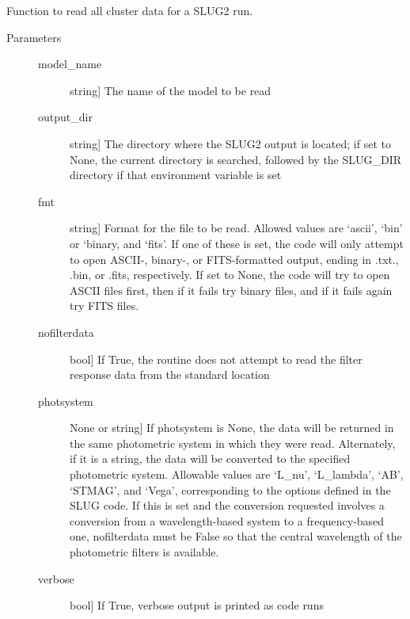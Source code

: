 \documentclass[letterpaper,10pt,english]{sphinxmanual}
\begin{document}
\begin{fulllineitems}
\label{slugpy:slugpy.read_cluster}
Function to read all cluster data for a SLUG2 run.
\begin{description}
\item[{Parameters}] \leavevmode\begin{description}
\item[{model\_name}] \leavevmode{[}string{]}
The name of the model to be read

\item[{output\_dir}] \leavevmode{[}string{]}
The directory where the SLUG2 output is located; if set to None,
the current directory is searched, followed by the SLUG\_DIR
directory if that environment variable is set

\item[{fmt}] \leavevmode{[}string{]}
Format for the file to be read. Allowed values are `ascii',
`bin' or `binary, and `fits'. If one of these is set, the code
will only attempt to open ASCII-, binary-, or FITS-formatted
output, ending in .txt., .bin, or .fits, respectively. If set
to None, the code will try to open ASCII files first, then if
it fails try binary files, and if it fails again try FITS
files.

\item[{nofilterdata}] \leavevmode{[}bool{]}
If True, the routine does not attempt to read the filter
response data from the standard location

\item[{photsystem}] \leavevmode{[}None or string{]}
If photsystem is None, the data will be returned in the same
photometric system in which they were read. Alternately, if it
is a string, the data will be converted to the specified
photometric system. Allowable values are `L\_nu', `L\_lambda',
`AB', `STMAG', and `Vega', corresponding to the options defined
in the SLUG code. If this is set and the conversion requested
involves a conversion from a wavelength-based system to a
frequency-based one, nofilterdata must be False so that the
central wavelength of the photometric filters is available.

\item[{verbose}] \leavevmode{[}bool{]}
If True, verbose output is printed as code runs


\end{description}
\end{description}
\end{fulllineitems}
\end{document}
